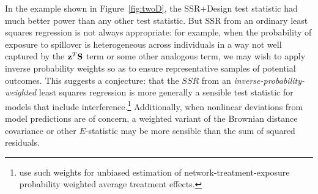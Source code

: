 In the example shown in Figure~\ref{fig:twoD}, the SSR+Design test statistic had much better power than
any other test statistic. But SSR from an ordinary least squares regression is
not always appropriate: for example, when the probability of exposure to
spillover is heterogeneous across individuals in a way not well captured by the
$\mathbf{z}^T \mathbf{S}$ term or some other analogous term, we may wish to apply inverse
probability weights so as to ensure representative samples of potential
outcomes. This suggests a conjecture: that the $SSR$ from an \emph{inverse-probability-weighted} least squares regression is more generally a
sensible test statistic for models that include
interference.\footnote{\citet{aronowsamii2012interfere} use such weights for
  unbiased estimation of network-treatment-exposure probability weighted
  average treatment effects.}  Additionally, when nonlinear deviations from
model predictions are of concern, a weighted variant of the Brownian distance
covariance \citep{szekely2009brownian} or other $E$-statistic may be more
sensible than the sum of squared residuals.


